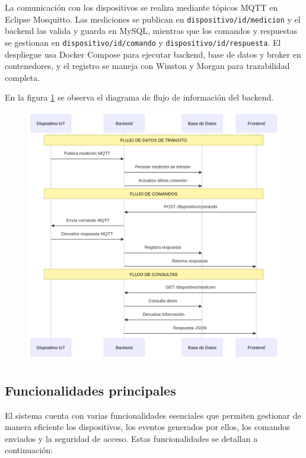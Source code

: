 La comunicación con los dispositivos se realiza mediante tópicos MQTT en Eclipse Mosquitto. Las mediciones se publican en \texttt{dispositivo/{id}/medicion} y el backend las valida y guarda en MySQL, mientras que los comandos y respuestas se gestionan en \texttt{dispositivo/{id}/comando} y \texttt{dispositivo/{id}/respuesta}. El despliegue usa Docker Compose \cite{docker_compose} para ejecutar backend, base de datos y broker \cite{mqttSpec} en contenedores, y el registro se maneja con Winston \cite{winston} y Morgan \cite{morgan} para trazabilidad completa.

En la figura \ref{fig:diagrama_backend} se observa el diagrama de flujo de información del backend.


\begin{figure}[H]
 
  \centering
  \includegraphics[width=0.9\linewidth]{./Figures/diagFlujoConexionBackend.png}
  \label{fig:diagrama_backend}
  \end{figure}


\subsection{Funcionalidades principales}
El sistema cuenta con varias funcionalidades esenciales que permiten gestionar de manera eficiente los dispositivos, los eventos generados por ellos, los comandos enviados y la seguridad de acceso. Estas funcionalidades se detallan a continuación:

